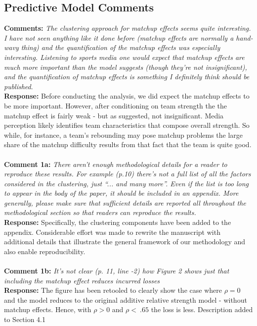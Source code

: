 \documentclass[11pt]{article} %
\begin{document}
\subsection*{Predictive Model Comments}
{\bf Comments:}  \emph{The clustering approach for matchup effects seems quite interesting. I have not seen anything like it done before (matchup effects are normally a hand-wavy thing) and the quantification of the matchup effects was especially interesting. Listening to sports media one would expect that matchup effects are much more important than the model suggests (though they're not insignificant), and the quantification of matchup effects is something I definitely think should be published}. \\
{\bf Response:} Before conducting the analysis, we did expect the matchup effects to be more important. However, after conditioning on team strength the the matchup effect is fairly weak - but as suggested, not insignificant. Media perception likely identifies team characteristics that compose overall strength. So while, for instance, a team's rebounding may pose matchup problems the large share of the matchup difficulty results from that fact that the team is quite good. \\
\\
{\bf Comment 1a:}  \emph{There aren't enough methodological details for a reader to reproduce these results. For example (p.10) there's not a full list of all the factors considered in the clustering, just ``... and many more''. Even if the list is too long to appear in the body of the paper, it should be included in an appendix. More generally, please make sure that sufficient details are reported all throughout the methodological section so that readers can reproduce the results.} \\
{\bf Response:} Specifically, the clustering components have been added to the appendix. Considerable effort was made to rewrite the manuscript with additional details that illustrate the general framework of our methodology and also enable reproducibility. \\
\\
{\bf Comment 1b:}  \emph{It's not clear (p. 11, line -2) how Figure 2 shows just that including the matchup effect reduces incurred losses} \\
{\bf Response:} The figure has been retooled to clearly show the case where $\rho=0$ and the model reduces to the original additive relative strength model - without matchup effects. Hence, with $\rho > 0$ and $\rho < ~.65$ the loss is less. Description added to Section 4.1\\
\end{document}
